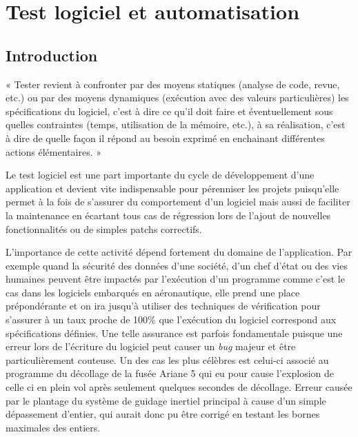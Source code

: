 \chapter{Test logiciel et automatisation} %

\label{Chapter1} %


\section{Introduction}

« Tester revient à confronter par des moyens statiques (analyse de code, revue, etc.) ou par des moyens dynamiques (exécution avec des valeurs particulières) les spécifications du logiciel, c’est à dire ce qu’il doit faire et éventuellement sous quelles contraintes (temps, utilisation de la mémoire, etc.), à sa réalisation, c’est à dire de quelle façon il répond au besoin exprimé en enchainant différentes actions élémentaires. »\cite{jfpp-test}

Le test logiciel est une part importante du cycle de développement d'une application et devient vite indispensable pour pérenniser les projets puisqu'elle permet à la fois de s'assurer du comportement d'un logiciel mais aussi de faciliter la maintenance en écartant tous cas de régression lors de l'ajout de nouvelles fonctionnalités ou de simples patchs correctifs.

L'importance de cette activité dépend fortement du domaine de l'application.
Par exemple quand la sécurité des données d'une société, d'un chef d'état ou des vies humaines peuvent être impactés par l'exécution d'un programme comme c'est le cas dans les logiciels embarqués en aéronautique, elle prend une place prépondérante et on ira jusqu'à utiliser des techniques de vérification pour s'assurer à un taux proche de 100\% que l'exécution du logiciel correspond aux spécifications définies. 
Une telle assurance est parfois fondamentale puisque une erreur lors de l'écriture du logiciel peut causer un \textit{bug} majeur et être particulièrement couteuse. Un des cas les plus célèbres est celui-ci associé au programme du décollage de la fusée Ariane 5\cite{ariane5} qui eu pour cause l'explosion de celle ci en plein vol après seulement quelques secondes de décollage. Erreur causée par le plantage du système de guidage inertiel principal à cause d'un simple dépassement d'entier, qui aurait donc pu être corrigé en testant les bornes maximales des entiers.

